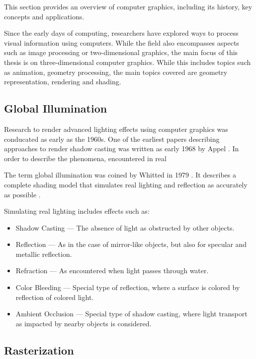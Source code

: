 This section provides an overview of computer graphics, including its history, key concepts and applications.

Since the early days of computing, researchers have explored ways to process visual information using computers. While the field also encompasses aspects such as image processing or two-dimensional graphics, the main focus of this thesis is on three-dimensional computer graphics. While this includes topics such as animation, geometry processing, the main topics covered are geometry representation, rendering and shading.

\subsection{Global Illumination}

Research to render advanced lighting effects using computer graphics was conducated as early as the 1960s. One of the earliest papers describing approaches to render shadow casting was written as early 1968 by Appel \cite{appel1968shading}. In order to describe the phenomena, encountered in real 

The term global illumination was coined by Whitted in 1979 \cite{whittedGlobalIllumination}. It describes a complete shading model that simulates real lighting and reflection as accurately as possible \cite{whitted2020OriginsOfGlobalIllumination}.

Simulating real lighting includes effects such as:

\begin{itemize}
  \item{Shadow Casting} — The absence of light as obstructed by other objects.
  \item{Reflection} — As in the case of mirror-like objects, but also for specular and metallic reflection.
  \item{Refraction} — As encountered when light passes through water.
  \item{Color Bleeding} — Special type of reflection, where a surface is colored by reflection of colored light.
  \item{Ambient Occlusion} — Special type of shadow casting, where light transport as impacted by nearby objects is considered.
\end{itemize}


\subsection{Rasterization}
\label{ch:rasterizationTheory}

